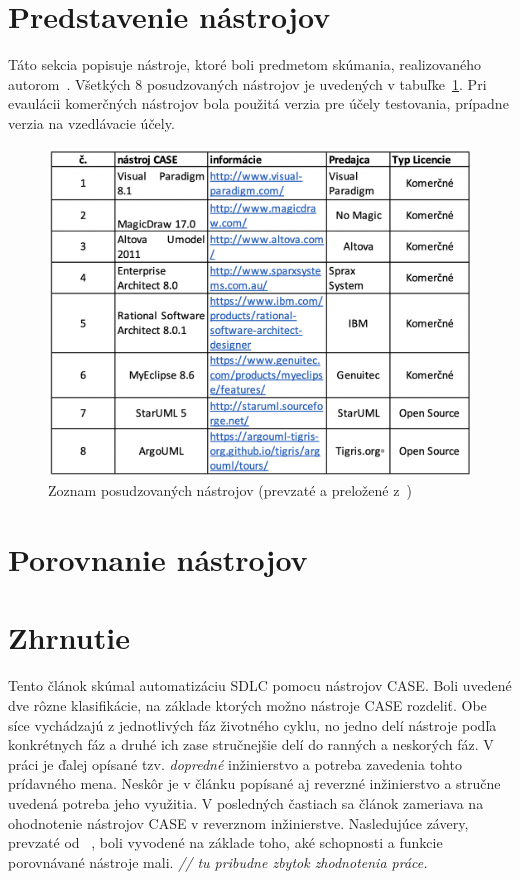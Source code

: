 \documentclass[10pt,twoside,slovak,a4paper]{article}
\begin{document}
\section{Predstavenie nástrojov}\label{predstavenie}

Táto sekcia popisuje nástroje, ktoré boli predmetom skúmania, realizovaného autorom~\cite{Osman:RE}. Všetkých 8 posudzovaných nástrojov je uvedených v tabuľke~\ref{tabulka1}. Pri evaulácii komerčných nástrojov bola použitá verzia pre účely testovania, prípadne verzia na vzedlávacie účely.

\begin{figure}[h]
\centering
\includegraphics[width=1\textwidth]{tabulka1.png}
\caption{Zoznam posudzovaných nástrojov (prevzaté a preložené z~\cite{Osman:RE})}
\label{tabulka1}
\end{figure}

\section{Porovnanie nástrojov}\label{porovnanie}

\section{Zhrnutie} \label{zhrnutie} 
Tento článok skúmal automatizáciu SDLC pomocu nástrojov CASE. Boli uvedené dve rôzne klasifikácie, na základe ktorých možno nástroje CASE rozdeliť. Obe síce vychádzajú z jednotlivých fáz životného cyklu, no jedno delí nástroje podľa konkrétnych fáz a druhé ich zase stručnejšie delí do ranných a neskorých fáz.
V práci je ďalej opísané tzv. \emph{dopredné} inžinierstvo a potreba zavedenia tohto prídavného mena. Neskôr je v článku popísané aj reverzné inžinierstvo a stručne uvedená potreba jeho využitia. 
V posledných častiach sa článok zameriava na ohodnotenie nástrojov CASE v reverznom inžinierstve. Nasledujúce závery, prevzaté od~ \cite{Osman:RE}, boli vyvodené na základe toho, aké schopnosti a funkcie porovnávané nástroje mali.
\emph{// tu pribudne zbytok zhodnotenia práce.}






\end{document}
